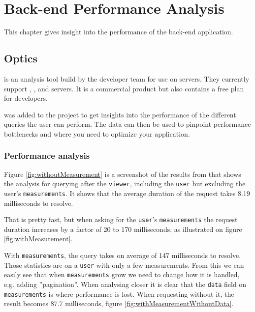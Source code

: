 \chapter{Back-end Performance Analysis}
This chapter gives insight into the performance of the back-end application.

\section{Optics}
 is an analysis tool build by the  developer team for use on  servers. 
They currently support , ,  and  servers. 
It is a commercial product but also contains a free plan for developers.

 was added to the project to get insights into the performance of the different queries the user can perform. 
The data can then be used to pinpoint performance bottlenecks and where you need to optimize your application.

\subsection{Performance analysis}
Figure \ref{fig:withoutMeasurement} is a screenshot of the results from  that shows the analysis for querying after the \verb+viewer+, including the \verb+user+ but excluding the user's \verb+measurements+. 
It shows that the average duration of the request takes 8.19 milliseconds to resolve. 


That is pretty fast, but when asking for the \verb+user+'s \verb+measurements+ the request duration increases by a factor of 20 to 170 milliseconds, as illustrated on figure \ref{fig:withMeasurement}.


With \verb+measurements+, the query takes on average of 147 milliseconds to resolve.
Those statistics are on a \verb+user+ with only a few measurements.
From this we can easily see that when \verb+measurements+ grow we need to change how it is handled, e.g. adding ''pagination''. 
When analysing closer it is clear that the \verb+data+ field on \verb+measurements+ is where performance is lost.
When requesting without it, the result becomes $87.7$ milliseconds, figure \ref{fig:withMeasurementWithoutData}.

